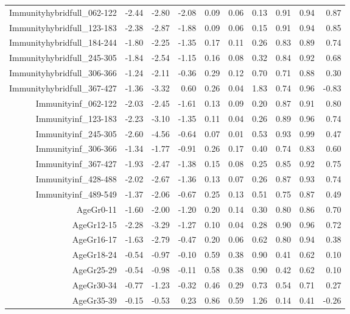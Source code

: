 \begin{table}[ht]
\begin{tabular}{rrrrrrrrrr}
  Immunityhybridfull\_062-122 & -2.44 & -2.80 & -2.08 & 0.09 & 0.06 & 0.13 & 0.91 & 0.94 & 0.87 \\ 
  Immunityhybridfull\_123-183 & -2.38 & -2.87 & -1.88 & 0.09 & 0.06 & 0.15 & 0.91 & 0.94 & 0.85 \\ 
  Immunityhybridfull\_184-244 & -1.80 & -2.25 & -1.35 & 0.17 & 0.11 & 0.26 & 0.83 & 0.89 & 0.74 \\ 
  Immunityhybridfull\_245-305 & -1.84 & -2.54 & -1.15 & 0.16 & 0.08 & 0.32 & 0.84 & 0.92 & 0.68 \\ 
  Immunityhybridfull\_306-366 & -1.24 & -2.11 & -0.36 & 0.29 & 0.12 & 0.70 & 0.71 & 0.88 & 0.30 \\ 
  Immunityhybridfull\_367-427 & -1.36 & -3.32 & 0.60 & 0.26 & 0.04 & 1.83 & 0.74 & 0.96 & -0.83 \\ 
  Immunityinf\_062-122 & -2.03 & -2.45 & -1.61 & 0.13 & 0.09 & 0.20 & 0.87 & 0.91 & 0.80 \\ 
  Immunityinf\_123-183 & -2.23 & -3.10 & -1.35 & 0.11 & 0.04 & 0.26 & 0.89 & 0.96 & 0.74 \\ 
  Immunityinf\_245-305 & -2.60 & -4.56 & -0.64 & 0.07 & 0.01 & 0.53 & 0.93 & 0.99 & 0.47 \\ 
  Immunityinf\_306-366 & -1.34 & -1.77 & -0.91 & 0.26 & 0.17 & 0.40 & 0.74 & 0.83 & 0.60 \\ 
  Immunityinf\_367-427 & -1.93 & -2.47 & -1.38 & 0.15 & 0.08 & 0.25 & 0.85 & 0.92 & 0.75 \\ 
  Immunityinf\_428-488 & -2.02 & -2.67 & -1.36 & 0.13 & 0.07 & 0.26 & 0.87 & 0.93 & 0.74 \\ 
  Immunityinf\_489-549 & -1.37 & -2.06 & -0.67 & 0.25 & 0.13 & 0.51 & 0.75 & 0.87 & 0.49 \\ 
  AgeGr0-11 & -1.60 & -2.00 & -1.20 & 0.20 & 0.14 & 0.30 & 0.80 & 0.86 & 0.70 \\ 
  AgeGr12-15 & -2.28 & -3.29 & -1.27 & 0.10 & 0.04 & 0.28 & 0.90 & 0.96 & 0.72 \\ 
  AgeGr16-17 & -1.63 & -2.79 & -0.47 & 0.20 & 0.06 & 0.62 & 0.80 & 0.94 & 0.38 \\ 
  AgeGr18-24 & -0.54 & -0.97 & -0.10 & 0.59 & 0.38 & 0.90 & 0.41 & 0.62 & 0.10 \\ 
  AgeGr25-29 & -0.54 & -0.98 & -0.11 & 0.58 & 0.38 & 0.90 & 0.42 & 0.62 & 0.10 \\ 
  AgeGr30-34 & -0.77 & -1.23 & -0.32 & 0.46 & 0.29 & 0.73 & 0.54 & 0.71 & 0.27 \\ 
  AgeGr35-39 & -0.15 & -0.53 & 0.23 & 0.86 & 0.59 & 1.26 & 0.14 & 0.41 & -0.26 \\ 

\end{tabular}
\end{table}
